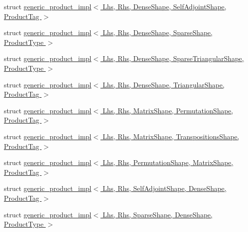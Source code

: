 \begin{DoxyCompactItemize}
\item 
struct \hyperlink{struct_eigen_1_1internal_1_1generic__product__impl_3_01_lhs_00_01_rhs_00_01_dense_shape_00_01_se2e8cb7106d8225767d620f93988c2a09}{generic\+\_\+product\+\_\+impl$<$ Lhs, Rhs, Dense\+Shape, Self\+Adjoint\+Shape, Product\+Tag $>$}
\item 
struct \hyperlink{struct_eigen_1_1internal_1_1generic__product__impl_3_01_lhs_00_01_rhs_00_01_dense_shape_00_01_sp21121e5deb0bbd0b6e9032984c439886}{generic\+\_\+product\+\_\+impl$<$ Lhs, Rhs, Dense\+Shape, Sparse\+Shape, Product\+Type $>$}
\item 
struct \hyperlink{struct_eigen_1_1internal_1_1generic__product__impl_3_01_lhs_00_01_rhs_00_01_dense_shape_00_01_sp47812b7c46d160bb7782b8c6e085fdfe}{generic\+\_\+product\+\_\+impl$<$ Lhs, Rhs, Dense\+Shape, Sparse\+Triangular\+Shape, Product\+Type $>$}
\item 
struct \hyperlink{struct_eigen_1_1internal_1_1generic__product__impl_3_01_lhs_00_01_rhs_00_01_dense_shape_00_01_tre6f7b1bb2806815b569967282a3d5cae}{generic\+\_\+product\+\_\+impl$<$ Lhs, Rhs, Dense\+Shape, Triangular\+Shape, Product\+Tag $>$}
\item 
struct \hyperlink{struct_eigen_1_1internal_1_1generic__product__impl_3_01_lhs_00_01_rhs_00_01_matrix_shape_00_01_p381c4dc3e0472eab95109350dacc6fc1}{generic\+\_\+product\+\_\+impl$<$ Lhs, Rhs, Matrix\+Shape, Permutation\+Shape, Product\+Tag $>$}
\item 
struct \hyperlink{struct_eigen_1_1internal_1_1generic__product__impl_3_01_lhs_00_01_rhs_00_01_matrix_shape_00_01_tf888e33b0f360ba10ea614ccb9c9fdb1}{generic\+\_\+product\+\_\+impl$<$ Lhs, Rhs, Matrix\+Shape, Transpositions\+Shape, Product\+Tag $>$}
\item 
struct \hyperlink{struct_eigen_1_1internal_1_1generic__product__impl_3_01_lhs_00_01_rhs_00_01_permutation_shape_00d89930186aaeed972c89117934065103}{generic\+\_\+product\+\_\+impl$<$ Lhs, Rhs, Permutation\+Shape, Matrix\+Shape, Product\+Tag $>$}
\item 
struct \hyperlink{struct_eigen_1_1internal_1_1generic__product__impl_3_01_lhs_00_01_rhs_00_01_self_adjoint_shape_06e3f81c44c9a89e35e47ffcd48d159f9}{generic\+\_\+product\+\_\+impl$<$ Lhs, Rhs, Self\+Adjoint\+Shape, Dense\+Shape, Product\+Tag $>$}
\item 
struct \hyperlink{struct_eigen_1_1internal_1_1generic__product__impl_3_01_lhs_00_01_rhs_00_01_sparse_shape_00_01_d233f0596d1aaf62fecbcef5d636a2696}{generic\+\_\+product\+\_\+impl$<$ Lhs, Rhs, Sparse\+Shape, Dense\+Shape, Product\+Type $>$}

\end{DoxyCompactItemize}
